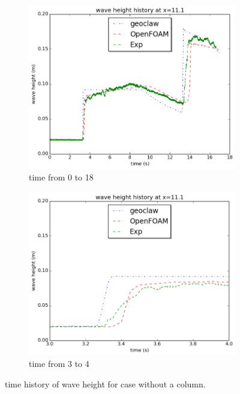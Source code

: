 \documentclass[11pt]{article}
\begin{document}
\begin{figure}[h!]
    \centering
    \begin{subfigure}[b]{0.4\textwidth}
        \includegraphics[width=1\textwidth]{./plots/waveheight_nocolumn}
        \caption{time from 0 to 18}
        \label{fig:waveheight_nocolumn}
    \end{subfigure}
    \begin{subfigure}[b]{0.4\textwidth}
        \includegraphics[width=1\textwidth]{./plots/waveheight_nocolumn_zoomin}
        \caption{time from 3 to 4}
        \label{fig:waveheight_nocolumn_zoomin}
    \end{subfigure}
    \caption{time history of wave height for case without a column. }
\end{figure}
\end{document}
